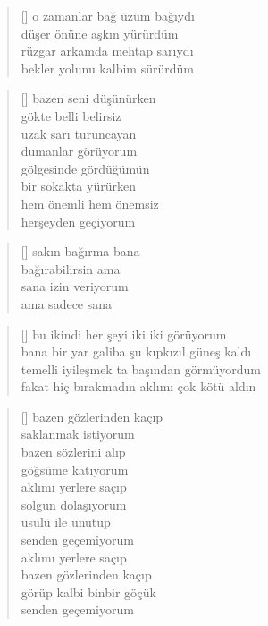 \documentclass[a5paper, openright, twoside]{memoir}
\begin{document}
\begin{verse}[\versewidth]
  o zamanlar bağ üzüm bağıydı \\
  düşer önüne aşkın yürürdüm \\
  rüzgar arkamda mehtap sarıydı \\
  bekler yolunu kalbim sürürdüm
\end{verse}
\begin{verse}[\versewidth]
  bazen seni düşünürken \\
  gökte belli belirsiz \\
  uzak sarı turuncayan \\
  dumanlar görüyorum \\
  gölgesinde gördüğümün \\
  bir sokakta yürürken \\
  hem önemli hem önemsiz \\
  herşeyden geçiyorum
\end{verse}
\begin{verse}[\versewidth]
  sakın bağırma bana \\
  bağırabilirsin ama \\
  sana izin veriyorum \\
  ama sadece sana
\end{verse}
\begin{verse}[\versewidth]
  bu ikindi her şeyi iki iki görüyorum \\
  bana bir yar galiba şu kıpkızıl güneş kaldı \\
  temelli iyileşmek ta başından görmüyordum \\
  fakat hiç bırakmadın aklımı çok kötü aldın
\end{verse}
\begin{verse}[\versewidth]
  bazen gözlerinden kaçıp \\
  saklanmak istiyorum \\
  bazen sözlerini alıp \\
  göğsüme katıyorum \\
  aklımı yerlere saçıp \\
  solgun dolaşıyorum \\
  usulü ile unutup \\
  senden geçemiyorum \\
  aklımı yerlere saçıp \\
  bazen gözlerinden kaçıp \\
  görüp kalbi binbir göçük \\
  senden geçemiyorum
\end{verse}
\end{document}
